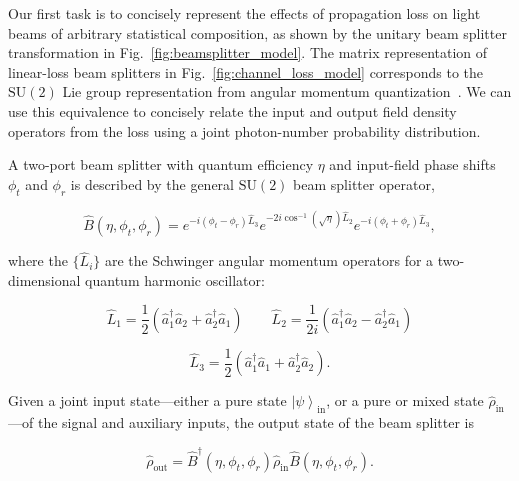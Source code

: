 \documentclass[aps,twocolumn,secnumarabic,amsmath,amssymb,pra,groupedaddress,
showpacs, showkeys,draft]{revtex4-1}
\newcommand{\ket}[1]{\left|#1\right\rangle}
\newcommand{\pna}[1]{\left(#1\right)}
\newcommand{\eqn}[1]{
\begin{equation}
	#1
\end{equation}
}
\begin{document}
Our first task is to concisely represent the effects of propagation loss on
light beams of arbitrary statistical composition, as shown by the unitary beam
splitter transformation in Fig.~\ref{fig:beamsplitter_model}.  The matrix
representation of linear-loss beam splitters in
Fig.~\ref{fig:channel_loss_model} corresponds to the $\textrm{SU}\pna{2}$ Lie
group representation from angular momentum
quantization~\cite{PhysRevA.40.1371}. We can use this equivalence to concisely
relate the input and output field density operators from the loss using a joint
photon-number probability distribution.

A two-port beam splitter with quantum efficiency $\eta$ and input-field phase
shifts $\phi_t$ and $\phi_r$ is described by the general $\textrm{SU}\pna{2}$
beam splitter operator,
\eqn{
\hat{B}\pna{\eta,\phi_t,\phi_r}=e^{-i\pna{\phi_t-\phi_r}\hat{L}_3}e^{-2i\cos^{-1}\pna{\sqrt{\eta}}\hat{L}_2}e^{-i\pna{\phi_t+\phi_r}\hat{L}_3},\label{eq:bs_operator_def}
}
where the $\{\hat{L}_i\}$ are the Schwinger angular momentum operators for a
two-dimensional quantum harmonic oscillator:
\eqn{
\hat{L}_1 = \frac{1}{2}\pna{\hat{a}_1^{\dagger}\hat{a}_2+\hat{a}^{\dagger}_2\hat{a}_1} \qquad 
\hat{L}_2 =
\frac{1}{2i}\pna{\hat{a}_1^{\dagger}\hat{a}_2-\hat{a}^{\dagger}_2\hat{a}_1}
\nonumber }
\eqn{
\hat{L}_3 = \frac{1}{2}\pna{\hat{a}_1^{\dagger}\hat{a}_1+\hat{a}^{\dagger}_2\hat{a}_2}.
}
Given a joint input state---either a pure state $\ket{\psi}_{\textrm{in}}$, or
a pure or mixed state $\hat{\rho}_{\textrm{in}}$---of the signal and auxiliary
inputs, the output state of the beam splitter is
\eqn{
\hat{\rho}_{\textrm{out}}=\hat{B}^{\dagger}\pna{\eta,\phi_t,\phi_r}\hat{\rho}_{\textrm{in}}\hat{B}\pna{\eta,\phi_t,\phi_r}.\label{eq:beamsplitter_trans}}
\end{document}
